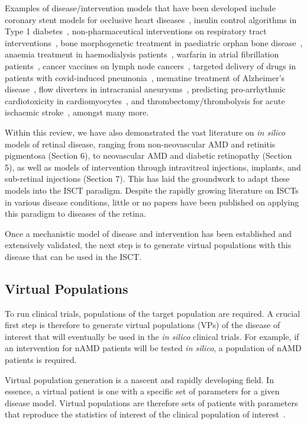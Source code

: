 \documentclass[12pt,a4paper]{journal}
\begin{document}
Examples of disease/intervention models that have been developed include coronary stent models for occlusive heart diseases~\cite{Antonini2021, Berti2021}, insulin control algorithms in Type 1 diabetes~\cite{Kovatchev2009}, non-pharmaceutical interventions on respiratory tract interventions~\cite{Arsene2022}, bone morphogenetic treatment in paediatric orphan bone disease~\cite{Carlier2018}, anaemia treatment in haemodialysis patients~\cite{Fuertinger2018}, warfarin in atrial fibrillation patients~\cite{Ravvaz2017}, cancer vaccines on lymph node cancers~\cite{Gaffney2022}, targeted delivery of drugs in patients with covid-induced pneumonia~\cite{Wang2022}, mematine treatment of Alzheimer’s disease~\cite{Swietlik2022}, flow diverters in intracranial aneurysms~\cite{SarramiForoushani2021}, predicting pro-arrhythmic cardiotoxicity in cardiomyocytes~\cite{Passini2017}, and thrombectomy/thrombolysis for acute ischaemic stroke~\cite{Konduri2020}, amongst many more.

Within this review, we have also demonstrated the vast literature on \textit{in silico} models of retinal disease, ranging from non-neovascular AMD and retinitis pigmentosa (Section 6), to neovascular AMD and diabetic retinopathy (Section 5), as well as models of intervention through intravitreal injections, implants, and sub-retinal injections (Section 7). This has laid the groundwork to adapt these models into the ISCT paradigm. Despite the rapidly growing literature on ISCTs in various disease conditions, little or no papers have been published on applying this paradigm to diseases of the retina.

Once a mechanistic model of disease and intervention has been established and extensively validated, the next step is to generate virtual populations with this disease that can be used in the ISCT.

\subsection*{Virtual Populations}

To run clinical trials, populations of the target population are required. A crucial first step is therefore to generate virtual populations (VPs) of the disease of interest that will eventually be used in the \textit{in silico} clinical trials. For example, if an intervention for nAMD patients will be tested \textit{in silico}, a population of nAMD patients is required.

Virtual population generation is a nascent and rapidly developing field. In essence, a virtual patient is one with a specific set of parameters for a given disease model. Virtual populations are therefore sets of patients with parameters that reproduce the statistics of interest of the clinical population of interest~\cite{Allen2016}.
\end{document}
